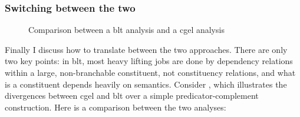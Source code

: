 \documentclass{article}
\begin{document}
\subsubsection{Switching between the two}

\begin{figure}
    \centering
    
    \caption{Comparison between a \ac{blt} analysis and a \ac{cgel} analysis}
    \label{fig:simple-clause-compare}
\end{figure}

Finally I discuss how to translate between the two approaches.
There are only two key points:
in \ac{blt}, most heavy lifting jobs are done by dependency relations within a large, non-branchable constituent, 
not constituency relations,
and what is a constituent depends heavily on semantics.
Consider ,
which illustrates the divergences between \ac{cgel} and \ac{blt} 
over a simple predicator-complement construction.
Here is a comparison between the two analyses:
\end{document}
